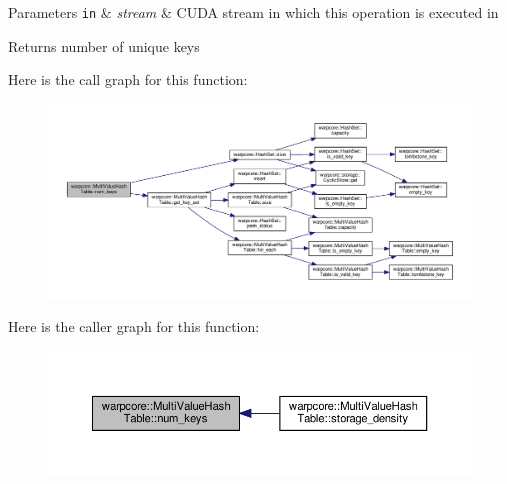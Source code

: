 \begin{DoxyParams}[1]{Parameters}
\mbox{\tt in}  & {\em stream} & C\+U\+DA stream in which this operation is executed in \\
\hline
\end{DoxyParams}
\begin{DoxyReturn}{Returns}
number of unique keys 
\end{DoxyReturn}
Here is the call graph for this function\+:
\nopagebreak
\begin{figure}[H]
\begin{center}
\leavevmode
\includegraphics[width=350pt]{classwarpcore_1_1MultiValueHashTable_aec537b17501127cd2bb44f60b90aecfa_cgraph}
\end{center}
\end{figure}
Here is the caller graph for this function\+:
\nopagebreak
\begin{figure}[H]
\begin{center}
\leavevmode
\includegraphics[width=350pt]{classwarpcore_1_1MultiValueHashTable_aec537b17501127cd2bb44f60b90aecfa_icgraph}
\end{center}
\end{figure}
\mbox{\label{classwarpcore_1_1MultiValueHashTable_ada2a3052b76a7d71bab214b1f466e4da}} 
